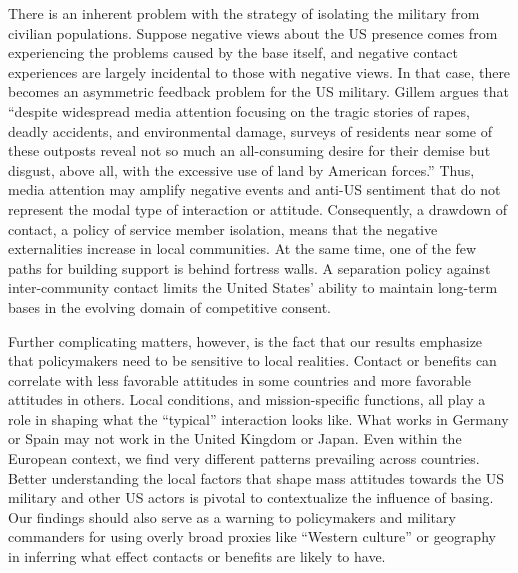There is an inherent problem with the strategy of isolating the military from civilian populations. Suppose negative views about the US presence comes from experiencing the problems caused by the base itself, and negative contact experiences are largely incidental to those with negative views. In that case, there becomes an asymmetric feedback problem for the US military. Gillem argues that ``despite widespread media attention focusing on the tragic stories of rapes, deadly accidents, and environmental damage, surveys of residents near some of these outposts reveal not so much an all-consuming desire for their demise but disgust, above all, with the excessive use of land by American forces.'' \autocite[p. xv]{Gillem2007} Thus, media attention may amplify negative events and anti-US sentiment that do not represent the modal type of interaction or attitude. Consequently, a drawdown of contact, a policy of service member isolation, means that the negative externalities increase in local communities. At the same time, one of the few paths for building support is behind fortress walls. A separation policy against inter-community contact limits the United States' ability to maintain long-term bases in the evolving domain of competitive consent.

Further complicating matters, however, is the fact that our results emphasize that policymakers need to be sensitive to local realities. Contact or benefits can correlate with less favorable attitudes in some countries and more favorable attitudes in others. Local conditions, and mission-specific functions, all play a role in shaping what the ``typical'' interaction looks like. What works in Germany or Spain may not work in the United Kingdom or Japan. Even within the European context, we find very different patterns prevailing across countries. Better understanding the local factors that shape mass attitudes towards the US military and other US actors is pivotal to contextualize the influence of basing. Our findings should also serve as a warning to policymakers and military commanders for using overly broad proxies like ``Western culture'' or geography in inferring what effect contacts or benefits are likely to have.

